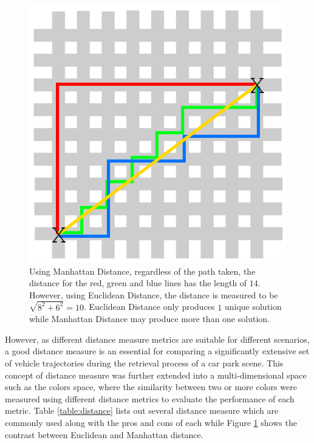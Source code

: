 \begin{figure}[hbt!]\centering
\includegraphics[width=.5\textwidth]{image/lit/manhattan.png}
\caption{Using Manhattan Distance, regardless of the path taken, the distance for the red, green and blue lines has the length of $14$. However, using Euclidean Distance, the distance is measured to be $\sqrt{8^2+6^2} = 10$. Euclidean Distance only produces $1$ unique solution while Manhattan Distance may produce more than one solution.}
\label{fig:manhattan}
\end{figure}


However, as different distance measure metrics are suitable for different scenarios, a good distance measure is an essential for comparing a significantly extensive set of vehicle trajectories during the retrieval process of a car park scene. This concept of distance measure was further extended into a multi-dimensional space such as the colors space, where the similarity between two or more colors were measured using different distance metrics to evaluate the performance of each metric. Table \ref{table:distance} lists out several distance measure which are commonly used along with the pros and cons of each while Figure \ref{fig:manhattan} shows the contrast between Euclidean and Manhattan distance.

